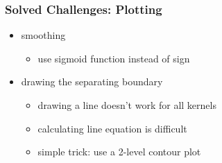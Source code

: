 \documentclass[english,hangout]{beamer}
\begin{document}
\begin{frame}
	\frametitle{Solved Challenges: Plotting}
  \begin{itemize}
  \item smoothing
    \begin{itemize}
    \item use sigmoid function instead of sign
    \end{itemize}
  \item drawing the separating boundary
    \begin{itemize}
    \item drawing a line doesn't work for all kernels
    \item calculating line equation is difficult
    \item simple trick: use a 2-level contour plot
    \end{itemize}
  \end{itemize}
\end{frame}
\end{document}
